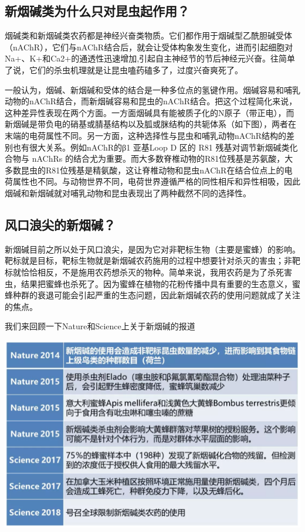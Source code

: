 \documentclass[]{book}
\begin{document}
\hypertarget{ux65b0ux70dfux78b1ux7c7bux4e3aux4ec0ux4e48ux53eaux5bf9ux6606ux866bux8d77ux4f5cux7528}{%
\subsection{新烟碱类为什么只对昆虫起作用？}\label{ux65b0ux70dfux78b1ux7c7bux4e3aux4ec0ux4e48ux53eaux5bf9ux6606ux866bux8d77ux4f5cux7528}}

烟碱类和新烟碱类农药都是神经兴奋类物质。它们都作用于烟碱型乙酰胆碱受体（nAChR），它们与nAChR结合后，就会让受体构象发生变化，进而引起细胞对Na+、K+和Ca2+的通透性迅速增加,引起自主神经节的节后神经元兴奋。往简单了说，它们的杀虫机理就是让昆虫嗑药磕多了，过度兴奋爽死了。

一般认为，烟碱、新烟碱和受体的结合是一种多位点的氢键作用。烟碱容易和哺乳动物的nAChR结合，而新烟碱容易和昆虫的nAChR结合。把这个过程简化来说，这种差异性表现在两个方面。一方面烟碱具有能被质子化的N原子（带正电），而新烟碱是带负电的硝基或腈基结构以及胍或脒结构的共轭体系（如下图），两者在末端的电荷属性不同。另一方面，这种选择性与昆虫和哺乳动物nAChR结构的差别也有很大关系。例如nAChR的β1 亚基Loop D 区的 R81 残基对调节新烟碱类化合物与 nAChRs 的结合尤为重要。而大多数脊椎动物的R81位残基是苏氨酸，大多数昆虫的R81位残基是精氨酸，这让脊椎动物和昆虫nAChR在结合位点上的电荷属性也不同。与动物世界不同，电荷世界遵循严格的同性相斥和异性相吸，因此烟碱和新烟碱就对哺乳动物和昆虫表现出了两种截然不同的选择性。

\hypertarget{ux98ceux53e3ux6d6aux5c16ux7684ux65b0ux70dfux78b1-1}{%
\subsection{风口浪尖的新烟碱？}\label{ux98ceux53e3ux6d6aux5c16ux7684ux65b0ux70dfux78b1-1}}

新烟碱目前之所以处于风口浪尖，是因为它对非靶标生物（主要是蜜蜂）的影响。靶标就是目标，靶标生物就是新烟碱农药施用的过程中想要针对杀灭的害虫；非靶标就恰恰相反，不是施用农药想杀灭的物种。简单来说，我用农药是为了杀死害虫，结果把蜜蜂也杀死了。因为蜜蜂在植物的花粉传播中具有重要的生态意义，蜜蜂种群的衰退可能会引起严重的生态问题，因此新烟碱农药的使用问题就成了关注的焦点。

我们来回顾一下Nature和Science上关于新烟碱的报道

\includegraphics[width=8.33in]{images/xyj1}
\end{document}
